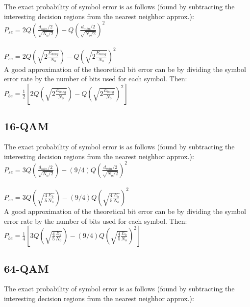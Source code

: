 \documentclass[]{article}
\begin{document}
The exact probability of symbol error is as follows (found by subtracting the interesting decision regions from the nearest neighbor approx.):\\

$ P_{se} = 2Q\left(\frac{d_{min}/2}{\sqrt{N_o/2}}\right)-Q\left(\frac{d_{min}/2}{\sqrt{N_o/2}}\right)^2$ \\ \\

$ P_{se} = 2Q\left(\sqrt{2\frac{E_{bavg}}{N_o}}\right)-Q\left(\sqrt{2\frac{E_{bavg}}{N_o}}\right)^2$ \\

A good approximation of the theoretical bit error can be by dividing the symbol error rate by the number of bits used for each symbol. Then:\\

 $ P_{be} = \frac{1}{2}\left[2Q\left(\sqrt{2\frac{E_{bavg}}{N_o}}\right)-Q\left(\sqrt{2\frac{E_{bavg}}{N_o}}\right)^2\right]$ \\


\subsection{16-QAM}
\label{sec:qam16}

The exact probability of symbol error is as follows (found by subtracting the interesting decision regions from the nearest neighbor approx.):\\

$ P_{se} = 3Q\left(\frac{d_{min}/2}{\sqrt{N_o/2}}\right)-(9/4)Q\left(\frac{d_{min}/2}{\sqrt{N_o/2}}\right)^2$ \\ \\

$ P_{se} = 3Q\left(\sqrt{\frac{4}{5}\frac{E_b}{N_o}}\right)-(9/4)Q\left(\sqrt{\frac{4}{5}\frac{E_{b}}{N_o}}\right)^2$  \\

A good approximation of the theoretical bit error can be by dividing the symbol error rate by the number of bits used for each symbol. Then:\\

$ P_{be} = \frac{1}{4}\left[3Q\left(\sqrt{\frac{4}{5}\frac{E_b}{N_o}}\right)-(9/4)Q\left(\sqrt{\frac{4}{5}\frac{E_{b}}{N_o}}\right)^2\right]$  \\


\subsection{64-QAM}
\label{sec:qam64}
The exact probability of symbol error is as follows (found by subtracting the interesting decision regions from the nearest neighbor approx.):\\
\end{document}
